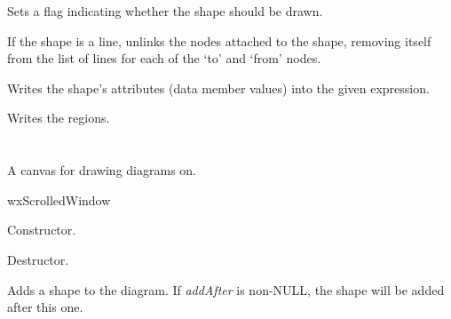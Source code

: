 Sets a flag indicating whether the shape should be drawn.



If the shape is a line, unlinks the nodes attached to the shape, removing itself from the list of
lines for each of the `to' and `from' nodes.



Writes the shape's attributes (data member values) into the given expression.



Writes the regions.

\section{}\label{wxshapecanvas}

A canvas for drawing diagrams on.


wxScrolledWindow






Constructor.



Destructor.



Adds a shape to the diagram. If {\it addAfter} is non-NULL, the shape will be added after this
one.

